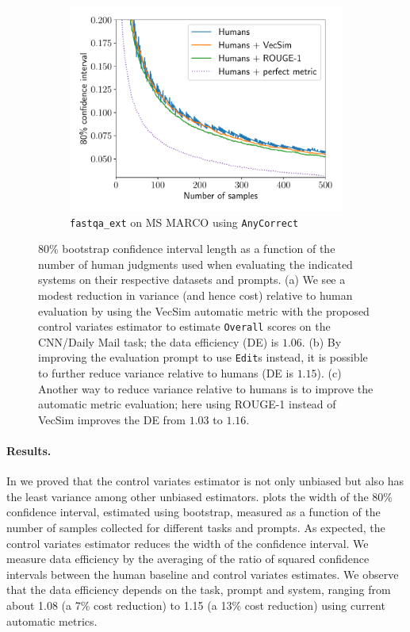 \begin{figure}[!p]
  \begin{subfigure}[b]{0.6\textwidth}
  \includegraphics[width=\textwidth]{figures/msmarco_trajectory}
  \caption{\label{fig:price:trajectory-c}\texttt{fastqa\_ext} on MS MARCO using \texttt{AnyCorrect}}
  \end{subfigure}

  \caption[Confidence intervals as a function of the number of human judgments used when evaluating systems]{\label{fig:price:trajectory} 80\% bootstrap confidence interval length as a function of the number of human judgments used when evaluating the indicated systems on their respective datasets and prompts.
  (a) We see a modest reduction in variance (and hence cost) relative to human evaluation by using the VecSim automatic metric with the proposed control variates estimator to estimate \texttt{Overall} scores on the CNN/Daily Mail task; the data efficiency (DE) is $1.06$.
  (b) By improving the evaluation prompt to use \texttt{Edit}s instead, it is possible to further reduce variance relative to humans (DE is $1.15$).
  (c) Another way to reduce variance relative to humans is to improve the automatic metric evaluation; here using ROUGE-1 instead of VecSim improves the DE from $1.03$ to $1.16$.
  }
\end{figure}

\paragraph{Results.}

In  we proved that the control variates estimator is not only unbiased but also has the least variance among other unbiased estimators.
 plots the width of the 80\% confidence interval, estimated using bootstrap, measured as a function of the number of samples collected for different tasks and prompts.
As expected, the control variates estimator reduces the width of the confidence interval. 
We measure data efficiency by the averaging of the ratio of squared confidence intervals between the human baseline and control variates estimates.
We observe that the data efficiency depends on the task, prompt and system, ranging from about 1.08 (a 7\% cost reduction) to 1.15 (a 13\% cost reduction) using current automatic metrics.

